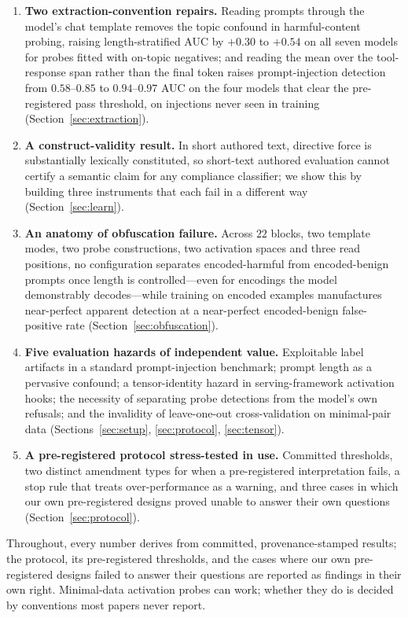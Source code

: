 \begin{enumerate}[leftmargin=*]
\item \textbf{Two extraction-convention repairs.} Reading prompts through the model's chat template removes the topic
      confound in harmful-content probing, raising length-stratified AUC by $+0.30$ to $+0.54$ on all seven models
      for probes fitted with on-topic negatives;
      and reading the mean over the tool-response span rather than the final token raises prompt-injection detection
      from $0.58$--$0.85$ to $0.94$--$0.97$ AUC on the four models that clear the pre-registered pass threshold, on
      injections never seen in training (Section~\ref{sec:extraction}).
\item \textbf{A construct-validity result.} In short authored text, directive force is substantially lexically
      constituted, so short-text authored evaluation cannot certify a semantic claim for any compliance classifier;
      we show this by building three instruments that each fail in a different way (Section~\ref{sec:learn}).
\item \textbf{An anatomy of obfuscation failure.} Across $22$ blocks, two template modes, two probe constructions,
      two activation spaces and three read positions, no configuration separates encoded-harmful from
      encoded-benign prompts once length is controlled---even for encodings the model demonstrably decodes---while training on encoded examples
      manufactures near-perfect apparent detection at a near-perfect encoded-benign false-positive rate
      (Section~\ref{sec:obfuscation}).
\item \textbf{Five evaluation hazards of independent value.} Exploitable label artifacts in a standard
      prompt-injection benchmark; prompt length as a pervasive confound; a tensor-identity hazard in serving-framework
      activation hooks; the necessity of separating probe detections from the model's own refusals; and the
      invalidity of leave-one-out cross-validation on minimal-pair data (Sections~\ref{sec:setup},
      \ref{sec:protocol}, \ref{sec:tensor}).
\item \textbf{A pre-registered protocol stress-tested in use.} Committed thresholds, two distinct amendment types for
      when a pre-registered interpretation fails, a stop rule that treats over-performance as a warning, and three
      cases in which our own pre-registered designs proved unable to answer their own questions
      (Section~\ref{sec:protocol}).
\end{enumerate}

Throughout, every number derives from committed, provenance-stamped results; the protocol, its pre-registered
thresholds, and the cases where our own pre-registered designs failed to answer their questions are reported as
findings in their own right. Minimal-data activation probes can work; whether they do is decided by conventions most
papers never report.
